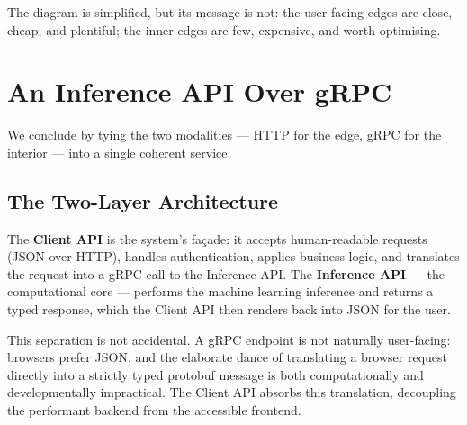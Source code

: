 \documentclass[11pt,a4paper]{article}
\theoremstyle{definition}
\theoremstyle{remark}
\begin{document}
The diagram is simplified, but its message is not: the user-facing edges are close, cheap, and plentiful; the inner edges are few, expensive, and worth optimising.

\section{An Inference API Over gRPC}

We conclude by tying the two modalities --- HTTP for the edge, gRPC for the interior --- into a single coherent service.

\subsection{The Two-Layer Architecture}

\begin{center}
\end{center}

The \textbf{Client API} is the system's façade: it accepts human-readable requests (JSON over HTTP), handles authentication, applies business logic, and translates the request into a gRPC call to the Inference API. The \textbf{Inference API} --- the computational core --- performs the machine learning inference and returns a typed response, which the Client API then renders back into JSON for the user.

This separation is not accidental. A gRPC endpoint is not naturally user-facing: browsers prefer JSON, and the elaborate dance of translating a browser request directly into a strictly typed protobuf message is both computationally and developmentally impractical. The Client API absorbs this translation, decoupling the performant backend from the accessible frontend.
\end{document}
